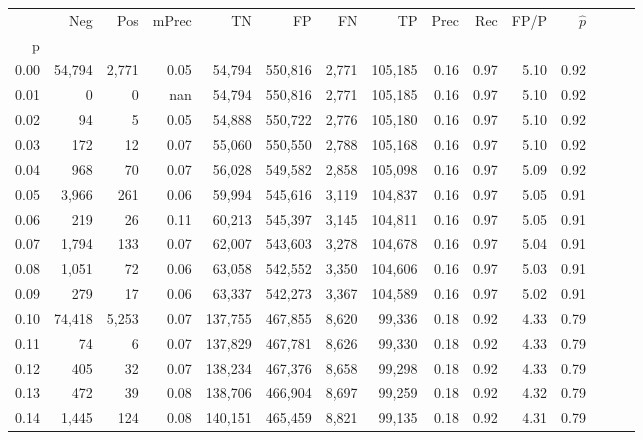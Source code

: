 \begin{tabular}{rrrrrrrrrrrrrrr}
\toprule
{} &     Neg &     Pos & mPrec &       TN &       FP &       FN &       TP &  Prec &   Rec &  FP/P & $\hat{p}$ \\
p    &         &         &       &          &          &          &          &       &       &       &           \\
\midrule
0.00 &  54,794 &   2,771 &  0.05 &   54,794 &  550,816 &    2,771 &  105,185 &  0.16 &  0.97 &  5.10 &      0.92 \\
0.01 &       0 &       0 &   nan &   54,794 &  550,816 &    2,771 &  105,185 &  0.16 &  0.97 &  5.10 &      0.92 \\
0.02 &      94 &       5 &  0.05 &   54,888 &  550,722 &    2,776 &  105,180 &  0.16 &  0.97 &  5.10 &      0.92 \\
0.03 &     172 &      12 &  0.07 &   55,060 &  550,550 &    2,788 &  105,168 &  0.16 &  0.97 &  5.10 &      0.92 \\
0.04 &     968 &      70 &  0.07 &   56,028 &  549,582 &    2,858 &  105,098 &  0.16 &  0.97 &  5.09 &      0.92 \\
0.05 &   3,966 &     261 &  0.06 &   59,994 &  545,616 &    3,119 &  104,837 &  0.16 &  0.97 &  5.05 &      0.91 \\
0.06 &     219 &      26 &  0.11 &   60,213 &  545,397 &    3,145 &  104,811 &  0.16 &  0.97 &  5.05 &      0.91 \\
0.07 &   1,794 &     133 &  0.07 &   62,007 &  543,603 &    3,278 &  104,678 &  0.16 &  0.97 &  5.04 &      0.91 \\
0.08 &   1,051 &      72 &  0.06 &   63,058 &  542,552 &    3,350 &  104,606 &  0.16 &  0.97 &  5.03 &      0.91 \\
0.09 &     279 &      17 &  0.06 &   63,337 &  542,273 &    3,367 &  104,589 &  0.16 &  0.97 &  5.02 &      0.91 \\
0.10 &  74,418 &   5,253 &  0.07 &  137,755 &  467,855 &    8,620 &   99,336 &  0.18 &  0.92 &  4.33 &      0.79 \\
0.11 &      74 &       6 &  0.07 &  137,829 &  467,781 &    8,626 &   99,330 &  0.18 &  0.92 &  4.33 &      0.79 \\
0.12 &     405 &      32 &  0.07 &  138,234 &  467,376 &    8,658 &   99,298 &  0.18 &  0.92 &  4.33 &      0.79 \\
0.13 &     472 &      39 &  0.08 &  138,706 &  466,904 &    8,697 &   99,259 &  0.18 &  0.92 &  4.32 &      0.79 \\
0.14 &   1,445 &     124 &  0.08 &  140,151 &  465,459 &    8,821 &   99,135 &  0.18 &  0.92 &  4.31 &      0.79 \\

\end{tabular}
